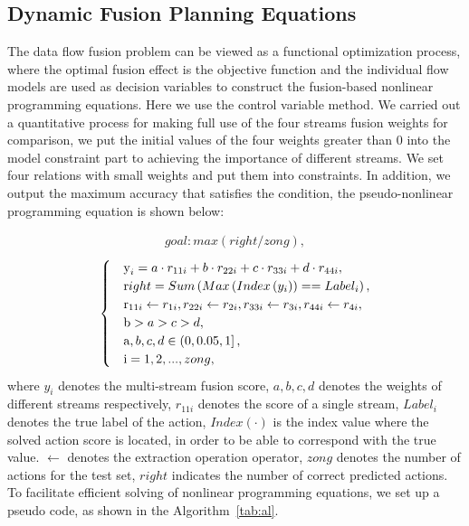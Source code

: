 \documentclass[letterpaper]{article} \usepackage[submission]{aaai23}  \usepackage{times}  \usepackage{helvet}  \usepackage{courier}  \usepackage[hyphens]{url}  \usepackage{graphicx} \urlstyle{rm} \def\UrlFont{\rm}  \usepackage{natbib}  \usepackage{caption} \frenchspacing  \setlength{\pdfpagewidth}{8.5in} \setlength{\pdfpageheight}{11in} \usepackage{algorithm}
\begin{document}
\subsection{Dynamic Fusion Planning Equations}
The data flow fusion problem can be viewed as a functional optimization process, where the optimal fusion effect is the objective function and the individual flow models are used as decision variables to construct the fusion-based nonlinear programming equations. Here we use the control variable method. We carried out a quantitative process for making full use of the four streams fusion weights for comparison, we put the initial values of the four weights greater than 0 into the model constraint part to achieving the importance of different streams.  We set four relations with small weights and put them into constraints. In addition, we output the maximum accuracy that satisfies the condition, the pseudo-nonlinear programming equation is shown below:


\begin{align}
\label{g1}
goal: max(right/zong),
\end{align}
\begin{align}
\label{g2}
\begin{cases}
 & \text y_{i}=a\cdot r_{11i}+b\cdot r_{22i}+c\cdot r_{33i}+d\cdot r_{44i}, \\ 
 & \text right=Sum\left ( Max\left ( Index\left ( y_{i}\right )\right )==Label_{i}\right ), \\ 
 & \text r_{11i}\leftarrow r_{1i},r_{22i}\leftarrow r_{2i},r_{33i}\leftarrow r_{3i},r_{44i}\leftarrow r_{4i},\\
 & \text b>a>c>d, \\
 & \text a,b,c,d\in \left ( 0,0.05,1\right ],\\
 & \text i=1,2,...,zong,
\end{cases}
\end{align}
where $y_{i}$ denotes the multi-stream fusion score, $a,b,c,d$ denotes the weights of different streams respectively, $r_{11i}$ denotes the score of a single stream, $Label_{i}$ denotes the true label of the action, $Index(\cdot)$ is the index value where the solved action score is located, in order to be able to correspond with the true value. $\leftarrow$ denotes the extraction operation operator, $zong$ denotes the number of actions for the test set, $right$ indicates the number of correct predicted actions. To facilitate efficient solving of nonlinear programming equations, we set up a pseudo code, as shown in the Algorithm~\ref{tab:al}.
\end{document}

